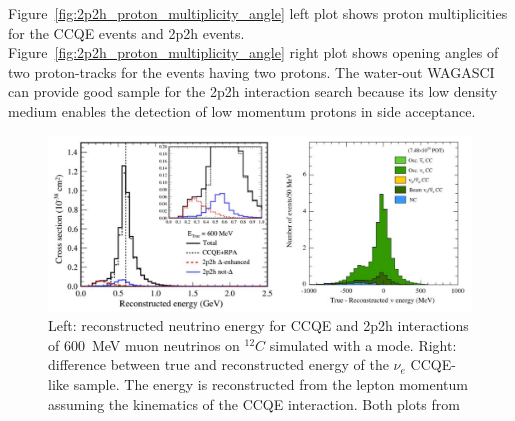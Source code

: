 Figure~\ref{fig:2p2h_proton_multiplicity_angle} left plot shows proton multiplicities for the CCQE events and 2p2h events.
Figure~\ref{fig:2p2h_proton_multiplicity_angle} right plot shows opening angles of two proton-tracks for the events having two protons.
The water-out WAGASCI can provide good sample for the 2p2h interaction search because its low density medium enables the detection of low momentum protons in side acceptance.
%
%
\begin{figure}[tbhp]
\begin{center}
\includegraphics[width=\linewidth]{fig/recE.pdf}
\end{center}
\caption{Left: reconstructed neutrino energy for CCQE and 2p2h interactions of 600~MeV muon neutrinos on $^{12}C$ simulated with a mode.
  Right: difference between true and reconstructed energy of the $\nu_e$ CCQE-like sample.
  The energy is reconstructed from the lepton momentum assuming the kinematics of the CCQE interaction.
  Both plots from \cite{Abe:2017vifw}
}
\label{fig:ene_rec_bias}
\end{figure}
%
